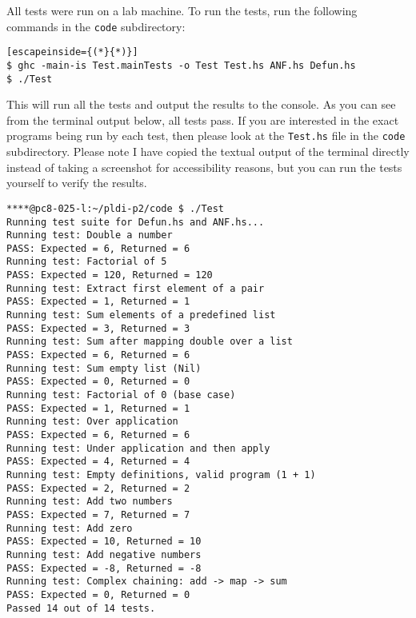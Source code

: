 \label{chapter:testing}

All tests were run on a lab machine. To run the tests, run the following commands in the \texttt{code} subdirectory:

\begin{lstlisting}[escapeinside={(*}{*)}]
$ ghc -main-is Test.mainTests -o Test Test.hs ANF.hs Defun.hs
$ ./Test
\end{lstlisting}

This will run all the tests and output the results to the console. As you can
see from the terminal output below, all tests pass. If you are interested in
the exact programs being run by each test, then please look at the
\texttt{Test.hs} file in the \texttt{code} subdirectory. Please note I have
copied the textual output of the terminal directly instead of taking a
screenshot for accessibility reasons, but you can run the tests yourself to
verify the results.

\begin{lstlisting}
****@pc8-025-l:~/pldi-p2/code $ ./Test
Running test suite for Defun.hs and ANF.hs...
Running test: Double a number
PASS: Expected = 6, Returned = 6
Running test: Factorial of 5
PASS: Expected = 120, Returned = 120
Running test: Extract first element of a pair
PASS: Expected = 1, Returned = 1
Running test: Sum elements of a predefined list
PASS: Expected = 3, Returned = 3
Running test: Sum after mapping double over a list
PASS: Expected = 6, Returned = 6
Running test: Sum empty list (Nil)
PASS: Expected = 0, Returned = 0
Running test: Factorial of 0 (base case)
PASS: Expected = 1, Returned = 1
Running test: Over application
PASS: Expected = 6, Returned = 6
Running test: Under application and then apply
PASS: Expected = 4, Returned = 4
Running test: Empty definitions, valid program (1 + 1)
PASS: Expected = 2, Returned = 2
Running test: Add two numbers
PASS: Expected = 7, Returned = 7
Running test: Add zero
PASS: Expected = 10, Returned = 10
Running test: Add negative numbers
PASS: Expected = -8, Returned = -8
Running test: Complex chaining: add -> map -> sum
PASS: Expected = 0, Returned = 0
Passed 14 out of 14 tests.
\end{lstlisting}

